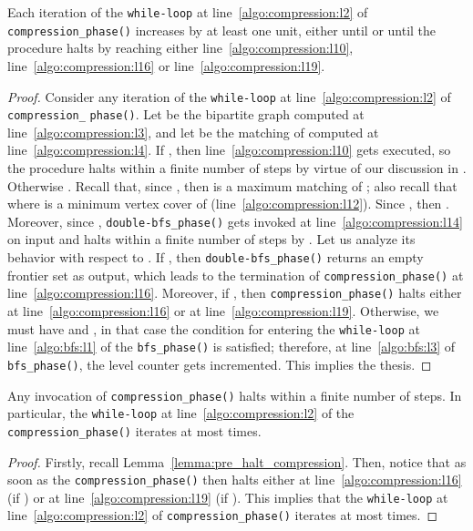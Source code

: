 \begin{lemma}\label{lemma:pre_halt_compression}
Each iteration of the \texttt{while-loop} at line~\ref{algo:compression:l2} of \texttt{compression\_phase()} increases
 by at least one unit,
either until  or until the procedure halts by reaching either
line~\ref{algo:compression:l10}, line~\ref{algo:compression:l16} or line~\ref{algo:compression:l19}.
\end{lemma}
\begin{proof} Consider any iteration of the \texttt{while-loop}
at line~\ref{algo:compression:l2} of \texttt{compression\_} \texttt{phase()}.
Let  be the bipartite graph computed at line~\ref{algo:compression:l3},
and let  be the matching of  computed at line~\ref{algo:compression:l4}.
If , then line~\ref{algo:compression:l10} gets executed, so the procedure halts
within a finite number of steps by virtue of our discussion in .
Otherwise . Recall that, since , then  is a maximum matching of ;
also recall that  where  is a minimum vertex cover of  (line~\ref{algo:compression:l12}).
Since , then .
Moreover, since , \texttt{double-bfs\_phase()} gets invoked
at line~\ref{algo:compression:l14} on input 
and
halts within a finite number of steps by .
Let us analyze its behavior with respect to .
If , then \texttt{double-bfs\_phase()} returns an empty frontier set  as output,
which leads to the termination of \texttt{compression\_phase()} at line~\ref{algo:compression:l16}.
Moreover, if ,
then
\texttt{compression\_phase()} halts
either at line~\ref{algo:compression:l16} or at line~\ref{algo:compression:l19}.
Otherwise, we must have  and ,
in that case the condition for entering the
\texttt{while-loop} at line~\ref{algo:bfs:l1} of the \texttt{bfs\_phase()} is satisfied;
therefore, at line~\ref{algo:bfs:l3} of \texttt{bfs\_phase()}, the level counter 
gets incremented.
This implies the thesis.
\end{proof}

\begin{lemma}\label{lemma:halt_compression}
Any invocation of \texttt{compression\_phase()} halts within a finite number of steps.
In particular, the \texttt{while-loop} at line~\ref{algo:compression:l2}
of the \texttt{compression\_phase()} iterates at most  times.
\end{lemma}
\begin{proof}
Firstly, recall Lemma~\ref{lemma:pre_halt_compression}.
Then, notice that as soon as 
the \texttt{compression\_phase()}
then halts either at line~\ref{algo:compression:l16} (if )
or at line~\ref{algo:compression:l19} (if ).
This implies that the \texttt{while-loop} at
line~\ref{algo:compression:l2} of \texttt{compression\_phase()}
iterates at most  times.
\end{proof}

